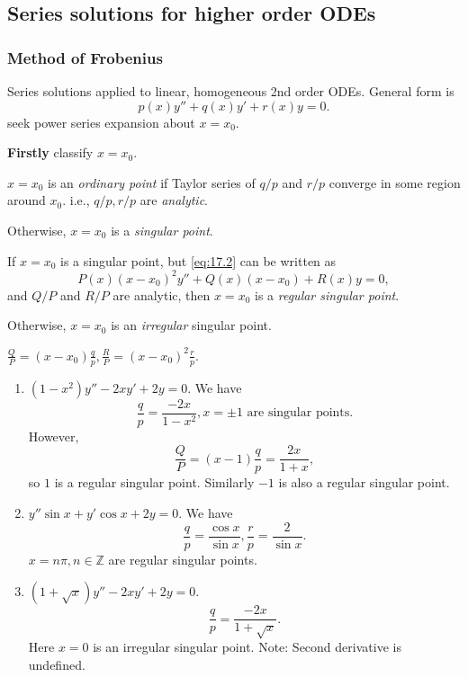\documentclass[a4paper]{article}
\newcommand{\bluecomment}[1]{{\color{blue}#1}}
\begin{document}
    \subsection{Series solutions for higher order ODEs}
    \subsubsection{Method of Frobenius}
    Series solutions applied to linear, homogeneous 2nd order ODEs. General form is 
    \begin{equation}\label{eq:17.2}
        p(x)y''+q(x)y'+r(x)y=0.
    \end{equation}
    seek power series expansion about $x=x_0$.
    
    \textbf{Firstly} classify $x=x_0$.
    \begin{definition}
        $x=x_0$ is an \textit{ordinary point} if Taylor series of $ q/p $ and $ r/p $ converge in some region around $x_0$. i.e., $ q/p, r/p $ are \textit{analytic}.

        Otherwise, $x=x_0$ is a \textit{singular point}.
    \end{definition} 
    \begin{definition}
        If $x=x_0$ is a singular point, but \ref{eq:17.2} can be written as 
        \[
            P(x)(x-x_0)^2y''+Q(x)(x-x_0)+R(x)y=0
        ,\]
        and $Q/P$ and $R/P$ are analytic, then $x=x_0$ is a \textit{regular singular point}.

        Otherwise, $x=x_0$ is an \textit{irregular} singular point.
    \end{definition}
    \begin{remark}
        $\displaystyle \frac{Q}{P}=(x-x_0)\frac{q}{p}, \frac{R}{P}=(x-x_0)^2\frac{r}{p}$. 
    \end{remark}
    \begin{example}
        \begin{enumerate}
            \item $ (1-x^2)y''-2xy'+2y=0 $. We have 
            \[
                \frac{q}{p}=\frac{-2x}{1-x^2}, x=\pm 1\text{ are singular points}
            .\]
            However, 
            \[
                \frac{Q}{P} = (x-1)\frac{q}{p}=\frac{2x}{1+x}
            ,\]
            so $1$ is a regular singular point. Similarly $-1$ is also a regular singular point.
            \item $ y'' \sin x + y' \cos x+2y=0 $. We have 
            \[
                \frac{q}{p}=\frac{\cos x}{\sin x}, \frac{r}{p}=\frac{2}{\sin x}
            .\]
            $ x=n\pi, n\in \mathbb{Z} $ are regular singular points.
            \item $ (1+\sqrt{x})y''-2xy'+2y=0 $.
            \[
                \frac{q}{p}=\frac{-2x}{1+\sqrt{x}}
            .\]
            Here $x=0$ is an irregular singular point.
            \bluecomment{Note: Second derivative is undefined.}
        \end{enumerate}
    \end{example}
\end{document}
